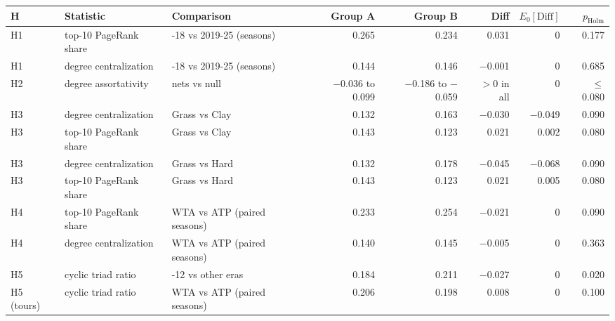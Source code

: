 \begin{tabular}{@{}ll>{\raggedright\arraybackslash}p{3.0cm}rrrrr@{}}
\toprule
H & Statistic & Comparison & Group A & Group B & Diff & $E_0[\mathrm{Diff}]$ & $p_{\mathrm{Holm}}$ \\
\midrule
H1 & top-10 PageRank share & 2007-18 vs 2019-25 (seasons) & 0.265 & 0.234 & 0.031 & 0 & 0.177 \\
H1 & degree centralization & 2007-18 vs 2019-25 (seasons) & 0.144 & 0.146 & $-$0.001 & 0 & 0.685 \\
H2 & degree assortativity & 8 nets vs null & $-$0.036 to 0.099 & $-$0.186 to $-$0.059 & $>0$ in all & 0 & $\le$0.080 \\
H3 & degree centralization & Grass vs Clay & 0.132 & 0.163 & $-$0.030 & $-$0.049 & 0.090 \\
H3 & top-10 PageRank share & Grass vs Clay & 0.143 & 0.123 & 0.021 & 0.002 & 0.080 \\
H3 & degree centralization & Grass vs Hard & 0.132 & 0.178 & $-$0.045 & $-$0.068 & 0.090 \\
H3 & top-10 PageRank share & Grass vs Hard & 0.143 & 0.123 & 0.021 & 0.005 & 0.080 \\
H4 & top-10 PageRank share & WTA vs ATP (paired seasons) & 0.233 & 0.254 & $-$0.021 & 0 & 0.090 \\
H4 & degree centralization & WTA vs ATP (paired seasons) & 0.140 & 0.145 & $-$0.005 & 0 & 0.363 \\
H5 & cyclic triad ratio & 2007-12 vs other eras & 0.184 & 0.211 & $-$0.027 & 0 & 0.020 \\
H5 (tours) & cyclic triad ratio & WTA vs ATP (paired seasons) & 0.206 & 0.198 & 0.008 & 0 & 0.100 \\
\bottomrule
\end{tabular}
